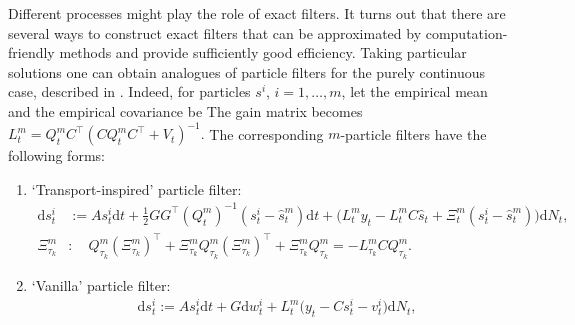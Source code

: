 \documentclass[12pt]{llncs}
\begin{document}
Different processes might play the role of exact filters. It turns out that there are several ways to construct exact filters that can be approximated by computation-friendly methods and provide sufficiently good efficiency.
Taking particular solutions %
one can obtain analogues of particle filters for the purely continuous case, described in \cite{bishop}. Indeed, for particles $s^i$, $i=1,\ldots,m$, let the empirical mean and the empirical covariance be
The gain matrix becomes $L_t^{m} = Q_t^{m} C^\top (C Q_t^{m} C^\top + V_t)^{-1}.$
The corresponding $m$-particle filters have the following forms:
\begin{enumerate}

\item `Transport-inspired' particle filter:
\begin{align}
    \mathrm{d} s^i_t &:= A s^i_t \mathrm{d} t +  \frac{1}{2}GG^\top (Q^{m}_t)^{-1} (s^i_t-\widehat s^{m}_t) \mathrm{d} t
    +  \Big(L^{m}_t y_t - L^{m}_t C \widehat s_t +\Xi^{m}_t (s^i_t - \widehat s^{m}_t) \Big) \mathrm{d} N_t,
    \label{eq:ch5: particles transport-insp}
    \\
    \Xi^{m}_{\tau_k} &: \quad Q^{m}_{\tau_k} (\Xi^{m}_{\tau_k})^\top + \Xi^{m}_{\tau_k} Q^{m}_{\tau_k} (\Xi^{m}_{\tau_k})^\top + \Xi^{m}_{\tau_k} Q^{m}_{\tau_k} = - L_{\tau_k}^{m} C Q^{m}_{\tau_k}.
    \label{eq:ch5: particles xi transport-insp}
\end{align}
\item `Vanilla' particle filter:
\begin{align}
\label{eq:ch5: particles vanilla}
&\mathrm{d} s^i_t := A s^i_t \mathrm{d} t +  G  \mathrm{d} w^i_t
    + L^{m}_t \Big(y_t - C s^i_t  - v^i_t \Big) \mathrm{d} N_t, %
\end{align}
\end{enumerate}
\end{document}
